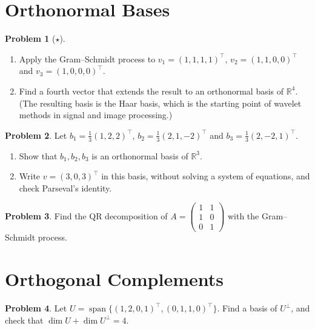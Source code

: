 \documentclass[11pt]{article}
\theoremstyle{definition}
\newtheorem{problem}{Problem}[section]
\DeclareMathOperator{\Span}{span}
\begin{document}
\section{Orthonormal Bases}

\begin{problem}[$\star$]\label{pr:gs-haar}
    \begin{enumerate}[label=(\alph*)]
        \item Apply the Gram--Schmidt process to $v_1 = (1, 1, 1, 1)^\top$, $v_2 = (1, 1, 0, 0)^\top$ and $v_3 = (1, 0, 0, 0)^\top$.
        \item Find a fourth vector that extends the result to an orthonormal basis of $\mathbb{R}^4$. (The resulting basis is the Haar basis, which is the starting point of wavelet methods in signal and image processing.)
    \end{enumerate}
\end{problem}

\begin{problem}\label{pr:onb-coords}
    Let $b_1 = \frac{1}{3}(1, 2, 2)^\top$, $b_2 = \frac{1}{3}(2, 1, -2)^\top$ and $b_3 = \frac{1}{3}(2, -2, 1)^\top$.
    \begin{enumerate}[label=(\alph*)]
        \item Show that $b_1, b_2, b_3$ is an orthonormal basis of $\mathbb{R}^3$.
        \item Write $v = (3, 0, 3)^\top$ in this basis, without solving a system of equations, and check Parseval's identity.
    \end{enumerate}
\end{problem}

\begin{problem}\label{pr:qr}
    Find the QR decomposition of $A = \begin{pmatrix} 1 & 1 \\ 1 & 0 \\ 0 & 1 \end{pmatrix}$ with the Gram--Schmidt process.
\end{problem}

\section{Orthogonal Complements}

\begin{problem}\label{pr:complement}
    Let $U = \Span\{(1, 2, 0, 1)^\top, (0, 1, 1, 0)^\top\}$. Find a basis of $U^\perp$, and check that $\dim U + \dim U^\perp = 4$.
\end{problem}
\end{document}
